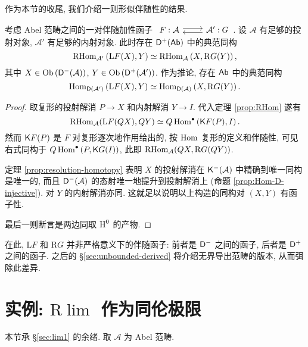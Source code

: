 作为本节的收尾, 我们介绍一则形似伴随性的结果.

\begin{theorem}\label{prop:RHom-adjoint-bounded}
	考虑 Abel 范畴之间的一对伴随加性函子
	$\begin{tikzcd}
		F: \mathcal{A} \arrow[r, shift left] & \mathcal{A}' \arrow[l, shift left] : G
	\end{tikzcd}$.
	设 $\mathcal{A}$ 有足够的投射对象, $\mathcal{A}'$ 有足够的内射对象. 此时存在 $\mathsf{D}^+(\mathsf{Ab})$ 中的典范同构
	\[ \operatorname{RHom}_{\mathcal{A'}}\left(\mathrm{L}F(X), Y\right) \simeq \operatorname{RHom}_{\mathcal{A}}\left(X, \mathrm{R}G(Y) \right), \]
	其中 $X \in \operatorname{Ob}\left(\mathsf{D}^-(\mathcal{A})\right)$, $Y \in \operatorname{Ob}\left(\mathsf{D}^+(\mathcal{A}')\right)$. 作为推论, 存在 $\mathsf{Ab}$ 中的典范同构
	\[ \operatorname{Hom}_{\mathsf{D}(\mathcal{A'})}\left(\mathrm{L}F(X), Y\right) \simeq \operatorname{Hom}_{\mathsf{D}(\mathcal{A})}\left(X, \mathrm{R}G(Y) \right). \]
\end{theorem}
\begin{proof}
	取复形的投射解消 $P \to X$ 和内射解消 $Y \to I$. 代入定理 \ref{prop:RHom} 遂有
	\[ \operatorname{RHom}_{\mathcal{A}}(\mathrm{L}F(QX), QY) \simeq Q\operatorname{Hom}^\bullet\left( \mathsf{K}F(P), I \right). \]
	然而 $\mathsf{K}F(P)$ 是 $F$ 对复形逐次地作用给出的, 按 $\operatorname{Hom}$ 复形的定义和伴随性, 可见右式同构于 $Q\operatorname{Hom}^\bullet\left( P, \mathsf{K}G(I) \right)$, 此即 $\operatorname{RHom}_{\mathcal{A}}(QX, \mathrm{R}G(QY))$.
	
	定理 \ref{prop:resolution-homotopy} 表明 $X$ 的投射解消在 $\mathsf{K}^-(\mathcal{A})$ 中精确到唯一同构是唯一的, 而且 $\mathsf{D}^-(\mathcal{A})$ 的态射唯一地提升到投射解消上 (命题 \ref{prop:Hom-D-injective}). 对 $Y$ 的内射解消亦同. 这就足以说明以上构造的同构对 $(X, Y)$ 有函子性.
	
	最后一则断言是两边同取 $\operatorname{H}^0$ 的产物.
\end{proof}

在此, $\mathrm{L}F$ 和 $\mathrm{R}G$ 并非严格意义下的伴随函子: 前者是 $\mathsf{D}^-$ 之间的函子, 后者是 $\mathsf{D}^+$ 之间的函子. 之后的 \S\ref{sec:unbounded-derived} 将介绍无界导出范畴的版本, 从而弭除此差异.

\section{实例: \texorpdfstring{$\mathrm{R}\lim$}{Rlim} 作为同伦极限}\label{sec:Rlim}
本节承 \S\ref{sec:lim1} 的余绪. 取 $\mathcal{A}$ 为 Abel 范畴.

